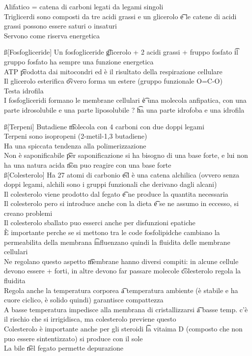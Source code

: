 \documentclass[12pt]{article}
\begin{document}
\s[Lipidi]
Alifatico = catena di carboni legati da legami singoli \\
Triglicerdi sono composti da tre acidi grassi e un glicerolo \t e le catene di acidi grassi possono essere saturi o insaturi \\
Servono come riserva energetica

\ss[Fosfogliceride]
Un fosfogliceride \t glicerolo + 2 acidi grassi + fruppo fosfato \t il gruppo fosfato ha sempre una funzione energetica \\
ATP \t prodotta dai mitocondri ed è il risultato della respirazione cellulare \\
Il glicerolo esterifica \t ovvero forma un estere (gruppo funzionale O=C-O) \\
Testa idrofila \\
I fosfogliceridi formano le membrane cellulari \t è una molecola anfipatica, con una parte idrosolubile e una parte liposolubile ? \t ha una parte idrofoba e una idrofila

\ss[Terpeni]
Butadiene \t molecola con 4 carboni con due doppi legami \\
Terpeni sono isopropeni (2-metil-1,3 butadiene) \\
Ha una spiccata tendenza alla polimerizzazione \\
Non è saponificabile \t per saponificazione si ha bisogno di una base forte, e lui non ha una natura acida \t non puo reagire con una base forte \\

\ss[Colesterolo]
Ha 27 atomi di carbonio \t ed è una catena alchilica (ovvero senza doppi legami, alchili sono i gruppi funzionali che derivano dagli alcani) \\
Il colesterolo viene prodotto dal fegato \t e ne produce la quantita necessaria \\
Il colesterolo pero si introduce anche con la dieta \t e se ne assumo in eccesso, si creano problemi \\
Il colesterolo sballato puo esserci anche per disfunzioni epatiche \\
È importante perche se si mettono tra le code fosfolipidche cambiano la permeabilita della membrana \t influenzano quindi la fluidita delle membrane cellulari \\
Ne regolano questo aspetto \t membrane hanno diversi compiti: in alcune cellule devono essere + forti, in altre devono far passare molecole \t colesterolo regola la fluidita \\
Regola anche la temperatura corporea \t a temperatura ambiente (è stabile e ha cuore ciclico, è solido quindi) garantisce compattezza \\
A basse temperatura impedisce alla membrana di cristallizzarsi \t a basse temp. c'è il rischio che si irrigidisca, ma colesterolo previene questo \\
Colesterolo è importante anche per gli steroidi \t la vitaima D (composto che non puo essere sintentizzato) si produce con il sole \\
La bile \t nel fegato permette depurazione
\end{document}
